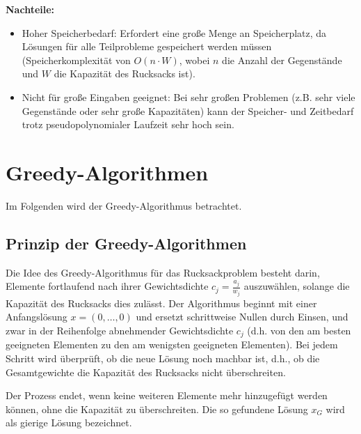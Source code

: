 \documentclass[12pt]{report}
\begin{document}
\textbf{Nachteile:}
\begin{itemize}
	\item Hoher Speicherbedarf: Erfordert eine große Menge an Speicherplatz, da Lösungen für alle Teilprobleme gespeichert werden müssen (Speicherkomplexität von $O(n \cdot W)$, wobei $n$ die Anzahl der Gegenstände und $W$ die Kapazität des Rucksacks ist).
	\item Nicht für große Eingaben geeignet: Bei sehr großen Problemen (z.B. sehr viele Gegenstände oder sehr große Kapazitäten) kann der Speicher- und Zeitbedarf trotz pseudopolynomialer Laufzeit sehr hoch sein.
\end{itemize}

\chapter{Greedy-Algorithmen}
Im Folgenden wird der Greedy-Algorithmus betrachtet.

\section{Prinzip der Greedy-Algorithmen}
Die Idee des Greedy-Algorithmus für das Rucksackproblem besteht darin, Elemente fortlaufend nach ihrer Gewichtsdichte \( c_j = \frac{a_j}{w_j} \) auszuwählen, solange die Kapazität des Rucksacks dies zulässt. Der Algorithmus beginnt mit einer Anfangslösung \( x = (0, \ldots, 0) \) und ersetzt schrittweise Nullen durch Einsen, und zwar in der Reihenfolge abnehmender Gewichtsdichte \( c_j \) (d.h. von den am besten geeigneten Elementen zu den am wenigsten geeigneten Elementen). Bei jedem Schritt wird überprüft, ob die neue Lösung noch machbar ist, d.h., ob die Gesamtgewichte die Kapazität des Rucksacks nicht überschreiten.

Der Prozess endet, wenn keine weiteren Elemente mehr hinzugefügt werden können, ohne die Kapazität zu überschreiten. Die so gefundene Lösung \( x_G \) wird als gierige Lösung bezeichnet. \cite{diubin2003average}

\end{document}
